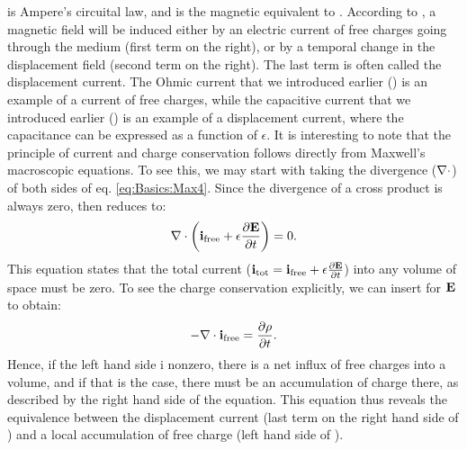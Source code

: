  is Ampere's circuital law, and is the magnetic equivalent to . According to , a magnetic field will be induced either by an electric current of free charges going through the medium (first term on the right), or by a temporal change in the displacement field (second term on the right). The last term is often called the displacement current. The Ohmic current that we introduced earlier () is an example of a current of free charges, while the capacitive current that we introduced earlier () is an example of a displacement current, where the capacitance can be expressed as a function of $\epsilon$.
%
It is interesting to note that the principle of current and charge conservation follows directly from Maxwell's macroscopic equations. To see this, we may start with taking the divergence (${\bf \nabla} \cdot$) of both sides of eq. \ref{eq:Basics:Max4}. Since the divergence of a cross product is always zero,  then reduces to:
\begin{equation}
{\bf \nabla} \cdot \left( {\bf i}_\text{free} +  \epsilon \frac{\partial {\bf E}}{\partial t} \right) = 0.
\label{eq:Basics:Max4dot}
\end{equation}
This equation states that the total current (${\bf i}_\text{tot} = {\bf i}_\text{free} +  \epsilon \frac{\partial {\bf E}}{\partial t}$) into any volume of space must be zero. To see the charge conservation explicitly, we can insert  for ${\bf E}$ to obtain:
\begin{equation}
- {\bf \nabla} \cdot {\bf i}_\text{free} =  \frac{\partial \rho}{\partial t}.
\label{eq:Basics:currentconservation}
\end{equation}
Hence, if the left hand side i nonzero, there is a net influx of free charges into a volume, and if that is the case, there must be an accumulation of charge there, as described by the right hand side of the equation. This equation thus reveals the equivalence between the displacement current (last term on the right hand side of ) and a local accumulation of free charge (left hand side of ).


